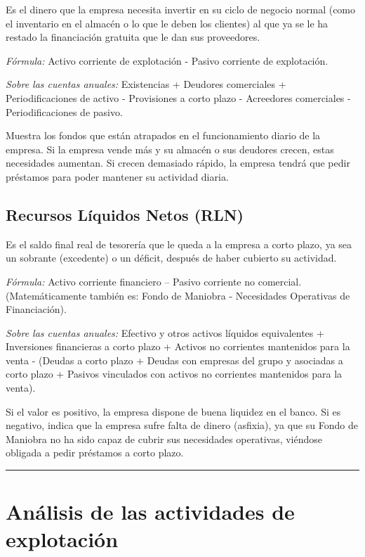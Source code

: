 \documentclass[12pt]{book} %
\begin{document}
Es el dinero que la empresa necesita invertir en su ciclo de negocio
normal (como el inventario en el almacén o lo que le deben los clientes)
al que ya se le ha restado la financiación gratuita que le dan sus
proveedores.

\emph{Fórmula:} Activo corriente de explotación - Pasivo corriente de
explotación.

\emph{Sobre las cuentas anuales:} Existencias + Deudores comerciales +
Periodificaciones de activo - Provisiones a corto plazo - Acreedores
comerciales - Periodificaciones de pasivo.

Muestra los fondos que están atrapados en el funcionamiento diario de la
empresa. Si la empresa vende más y su almacén o sus deudores crecen,
estas necesidades aumentan. Si crecen demasiado rápido, la empresa
tendrá que pedir préstamos para poder mantener su actividad diaria.

\hypertarget{recursos-luxedquidos-netos-rln}{%
\subsection{Recursos Líquidos Netos
(RLN)}\label{recursos-luxedquidos-netos-rln}}

Es el saldo final real de tesorería que le queda a la empresa a corto
plazo, ya sea un sobrante (excedente) o un déficit, después de haber
cubierto su actividad.

\emph{Fórmula:} Activo corriente financiero -- Pasivo corriente no
comercial. (Matemáticamente también es: Fondo de Maniobra - Necesidades
Operativas de Financiación).

\emph{Sobre las cuentas anuales:} Efectivo y otros activos líquidos
equivalentes + Inversiones financieras a corto plazo + Activos no
corrientes mantenidos para la venta - (Deudas a corto plazo + Deudas con
empresas del grupo y asociadas a corto plazo + Pasivos vinculados con
activos no corrientes mantenidos para la venta).

Si el valor es positivo, la empresa dispone de buena liquidez en el
banco. Si es negativo, indica que la empresa sufre falta de dinero
(asfixia), ya que su Fondo de Maniobra no ha sido capaz de cubrir sus
necesidades operativas, viéndose obligada a pedir préstamos a corto
plazo.

\begin{center}\rule{0.5\linewidth}{0.5pt}\end{center}

\hypertarget{anuxe1lisis-de-las-actividades-de-explotaciuxf3n}{%
\section{Análisis de las actividades de
explotación}\label{anuxe1lisis-de-las-actividades-de-explotaciuxf3n}}
\end{document}
